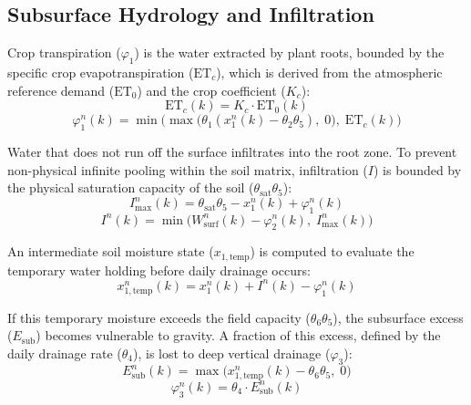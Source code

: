 \subsection{Subsurface Hydrology and Infiltration}

Crop transpiration ($\varphi_1$) is the water extracted by plant roots, bounded by the specific crop evapotranspiration ($\text{ET}_c$), which is derived from the atmospheric reference demand ($\text{ET}_0$) and the crop coefficient ($K_c$):
\begin{equation}
    \text{ET}_c(k) = K_c \cdot \text{ET}_0(k)
\end{equation}
\begin{equation}
    \varphi_1^n(k) = \min\!\Big(\max\!\big(\theta_1(x_1^n(k) - \theta_2\theta_5),\; 0\big),\; \text{ET}_c(k)\Big)
\end{equation}

Water that does not run off the surface infiltrates into the root zone. To prevent non-physical infinite pooling within the soil matrix, infiltration ($I$) is bounded by the physical saturation capacity of the soil ($\theta_{\text{sat}}\theta_5$):
\begin{equation}
    I_{\max}^n(k) = \theta_{\text{sat}}\theta_5 - x_1^n(k) + \varphi_1^n(k)
\end{equation}
\begin{equation}
    I^n(k) = \min\!\big(W_{\text{surf}}^n(k) - \varphi_2^n(k),\; I_{\max}^n(k)\big)
\end{equation}

An intermediate soil moisture state ($x_{1,\text{temp}}$) is computed to evaluate the temporary water holding before daily drainage occurs:
\begin{equation}
    x_{1,\text{temp}}^n(k) = x_1^n(k) + I^n(k) - \varphi_1^n(k)
\end{equation}

If this temporary moisture exceeds the field capacity ($\theta_6\theta_5$), the subsurface excess ($E_{\text{sub}}$) becomes vulnerable to gravity. A fraction of this excess, defined by the daily drainage rate ($\theta_4$), is lost to deep vertical drainage ($\varphi_3$):
\begin{equation}
    E_{\text{sub}}^n(k) = \max\!\big(x_{1,\text{temp}}^n(k) - \theta_6\theta_5,\; 0\big)
\end{equation}
\begin{equation}
    \varphi_3^n(k) = \theta_4 \cdot E_{\text{sub}}^n(k)
\end{equation}

